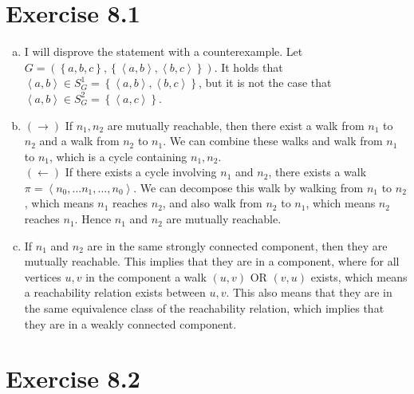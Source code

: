 \documentclass{article} %
\newcommand{\homeworkNumber}{8}
\begin{document}
\section*{Exercise \homeworkNumber.1}

\begin{enumerate}[(a)]
	\item I will disprove the statement with a counterexample. Let \( G = (\left\{ a,b,c \right\}, \left\{ \left< a,b \right>, \left< b,c \right>\right\} )  \). It holds that \( \left< a,b \right> \in S_{G}^{1} = \left\{ \left< a,b \right>, \left< b,c \right> \right\} \), but it is not the case that \( \left< a,b \right> \in S_{G}^{2} = \left\{ \left< a,c \right> \right\}  \).
	\item \( (\rightarrow) \) If \( n_{1}, n_{2} \) are mutually reachable, then there exist a walk from \( n_{1} \) to \( n_{2} \) and a walk from \( n_{2} \) to \( n_{1} \). We can combine these walks and walk from \( n_{1} \) to \( n_{1} \), which is a cycle containing \( n_{1},n_{2} \). \\
	      \( (\leftarrow) \) If there exists a cycle involving \( n_{1} \) and \( n_{2} \), there exists a walk \( \pi = \left< n_{0},\ldots n_{1},\ldots ,n_{0} \right> \). We can decompose this walk by walking from \( n_{1} \) to \( n_{2} \), which means \( n_{1} \) reaches \( n_{2} \), and also walk from \( n_{2} \) to \( n_{1} \), which means \( n_{2} \) reaches \( n_{1} \). Hence \( n_{1} \) and \( n_{2} \) are mutually reachable.
	\item If \( n_{1} \) and \( n_{2} \) are in the same strongly connected component, then they are mutually reachable. This implies that they are in a component, where for all vertices \( u,v \) in the component a walk \( (u,v) \) OR \( (v,u) \) exists, which means a reachability relation exists between \( u,v \). This also means that they are in the same equivalence class of the reachability relation, which implies that they are in a weakly connected component.
\end{enumerate}



\section*{Exercise \homeworkNumber.2}
\end{document}
